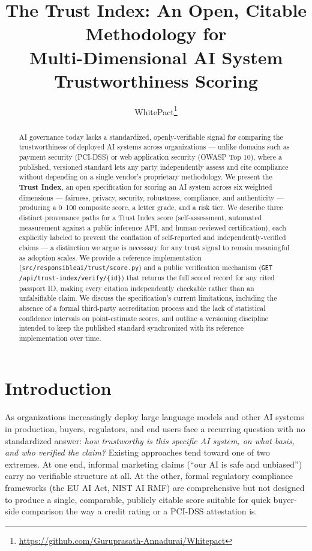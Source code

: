 \documentclass[11pt]{article}
\title{The Trust Index: An Open, Citable Methodology for\\
Multi-Dimensional AI System Trustworthiness Scoring}
\author{WhitePact\thanks{\url{https://github.com/Guruprasath-Annadurai/Whitepact}}}
\date{}
\begin{document}
\maketitle

\begin{abstract}
AI governance today lacks a standardized, openly-verifiable signal for
comparing the trustworthiness of deployed AI systems across
organizations --- unlike domains such as payment security (PCI-DSS) or
web application security (OWASP Top 10), where a published, versioned
standard lets any party independently assess and cite compliance
without depending on a single vendor's proprietary methodology. We
present the \textbf{Trust Index}, an open specification for scoring an
AI system across six weighted dimensions --- fairness, privacy,
security, robustness, compliance, and authenticity --- producing a
0--100 composite score, a letter grade, and a risk tier. We describe
three distinct provenance paths for a Trust Index score
(self-assessment, automated measurement against a public inference
API, and human-reviewed certification), each explicitly labeled to
prevent the conflation of self-reported and independently-verified
claims --- a distinction we argue is necessary for any trust signal to
remain meaningful as adoption scales. We provide a reference
implementation (\texttt{src/responsibleai/trust/score.py}) and a
public verification mechanism
(\texttt{GET /api/trust-index/verify/\{id\}}) that returns the full
scored record for any cited passport ID, making every citation
independently checkable rather than an unfalsifiable claim. We discuss
the specification's current limitations, including the absence of a
formal third-party accreditation process and the lack of statistical
confidence intervals on point-estimate scores, and outline a
versioning discipline intended to keep the published standard
synchronized with its reference implementation over time.
\end{abstract}

\section{Introduction}

As organizations increasingly deploy large language models and other
AI systems in production, buyers, regulators, and end users face a
recurring question with no standardized answer: \emph{how trustworthy
is this specific AI system, on what basis, and who verified the
claim?} Existing approaches tend toward one of two extremes. At one
end, informal marketing claims (``our AI is safe and unbiased'') carry
no verifiable structure at all. At the other, formal regulatory
compliance frameworks (the EU AI Act, NIST AI RMF) are comprehensive
but not designed to produce a single, comparable, publicly citable
score suitable for quick buyer-side comparison the way a credit rating
or a PCI-DSS attestation is.
\end{document}

